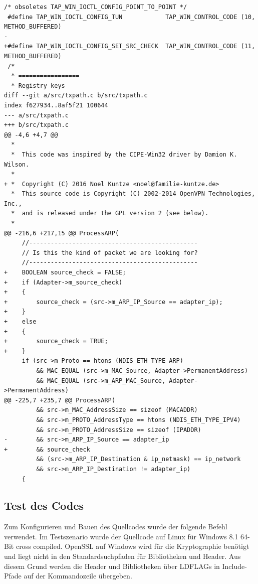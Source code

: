 \begin{lstlisting}[caption=Patch für TAP-Windows6]
 /* obsoletes TAP_WIN_IOCTL_CONFIG_POINT_TO_POINT */
 #define TAP_WIN_IOCTL_CONFIG_TUN            TAP_WIN_CONTROL_CODE (10, METHOD_BUFFERED)
-
+#define TAP_WIN_IOCTL_CONFIG_SET_SRC_CHECK  TAP_WIN_CONTROL_CODE (11, METHOD_BUFFERED)
 /*
  * =================
  * Registry keys
diff --git a/src/txpath.c b/src/txpath.c
index f627934..8af5f21 100644
--- a/src/txpath.c
+++ b/src/txpath.c
@@ -4,6 +4,7 @@
  *
  *  This code was inspired by the CIPE-Win32 driver by Damion K. Wilson.
  * 
+ *  Copyright (C) 2016 Noel Kuntze <noel@familie-kuntze.de>
  *  This source code is Copyright (C) 2002-2014 OpenVPN Technologies, Inc.,
  *  and is released under the GPL version 2 (see below).
  *
@@ -216,6 +217,15 @@ ProcessARP(
     //-----------------------------------------------
     // Is this the kind of packet we are looking for?
     //-----------------------------------------------
+    BOOLEAN source_check = FALSE;
+    if (Adapter->m_source_check)
+    {
+        source_check = (src->m_ARP_IP_Source == adapter_ip);
+    }
+    else
+    {
+        source_check = TRUE;
+    }
     if (src->m_Proto == htons (NDIS_ETH_TYPE_ARP)
         && MAC_EQUAL (src->m_MAC_Source, Adapter->PermanentAddress)
         && MAC_EQUAL (src->m_ARP_MAC_Source, Adapter->PermanentAddress)
@@ -225,7 +235,7 @@ ProcessARP(
         && src->m_MAC_AddressSize == sizeof (MACADDR)
         && src->m_PROTO_AddressType == htons (NDIS_ETH_TYPE_IPV4)
         && src->m_PROTO_AddressSize == sizeof (IPADDR)
-        && src->m_ARP_IP_Source == adapter_ip
+        && source_check
         && (src->m_ARP_IP_Destination & ip_netmask) == ip_network
         && src->m_ARP_IP_Destination != adapter_ip)
     {
\end{lstlisting}

\subsection{Test des Codes}
Zum Konfigurieren und Bauen des Quellcodes wurde der folgende Befehl verwendet.
Im Testszenario wurde der Quellcode auf Linux für Windows 8.1 64-Bit cross compiled.
OpenSSL auf Windows wird für die Kryptographie benötigt und liegt nicht in den Standardsuchpfaden
für Bibliotheken und Header. Aus diesem Grund werden die Header und Bibliotheken
über LDFLAGs in Include-Pfade auf der Kommandozeile übergeben.

